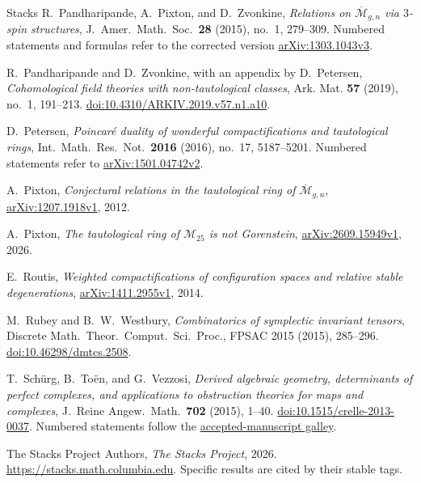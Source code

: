\begin{thebibliography}{Stacks}
R.~Pandharipande, A.~Pixton, and D.~Zvonkine,
\emph{Relations on $\overline{\mathcal M}_{g,n}$ via $3$-spin structures},
J.\ Amer.\ Math.\ Soc.\ \textbf{28} (2015), no.~1, 279--309.
Numbered statements and formulas refer to the corrected version
\href{https://arxiv.org/abs/1303.1043v3}{arXiv:1303.1043v3}.

R.~Pandharipande and D.~Zvonkine, with an appendix by D.~Petersen,
\emph{Cohomological field theories with non-tautological classes},
Ark. Mat. \textbf{57} (2019), no.~1, 191--213.
\href{https://doi.org/10.4310/ARKIV.2019.v57.n1.a10}{doi:10.4310/ARKIV.2019.v57.n1.a10}.

D.~Petersen,
\emph{Poincar\'e duality of wonderful compactifications and tautological rings},
Int.\ Math.\ Res.\ Not.\ \textbf{2016} (2016), no.~17, 5187--5201.
Numbered statements refer to
\href{https://arxiv.org/abs/1501.04742v2}{arXiv:1501.04742v2}.

A.~Pixton,
\emph{Conjectural relations in the tautological ring of
$\overline{\mathcal M}_{g,n}$},
\href{https://arxiv.org/abs/1207.1918v1}{arXiv:1207.1918v1}, 2012.

A.~Pixton,
\emph{The tautological ring of $\mathcal M_{25}$ is not Gorenstein},
\href{https://arxiv.org/abs/2609.15949v1}{arXiv:2609.15949v1}, 2026.

E.~Routis,
\emph{Weighted compactifications of configuration spaces and relative stable degenerations},
\href{https://arxiv.org/abs/1411.2955v1}{arXiv:1411.2955v1}, 2014.

M.~Rubey and B.~W.~Westbury,
\emph{Combinatorics of symplectic invariant tensors},
Discrete Math.\ Theor.\ Comput.\ Sci.\ Proc., FPSAC 2015 (2015), 285--296.
\href{https://doi.org/10.46298/dmtcs.2508}{doi:10.46298/dmtcs.2508}.

T.~Sch\"urg, B.~To\"en, and G.~Vezzosi,
\emph{Derived algebraic geometry, determinants of perfect complexes,
and applications to obstruction theories for maps and complexes},
J.\ Reine Angew.\ Math.\ \textbf{702} (2015), 1--40.
\href{https://doi.org/10.1515/crelle-2013-0037}{doi:10.1515/crelle-2013-0037}.
Numbered statements follow the
\href{https://flore.unifi.it/retrieve/e398c37f-a432-179a-e053-3705fe0a4cff/crelle.pdf}{accepted-manuscript galley}.

The Stacks Project Authors,
\emph{The Stacks Project}, 2026.
\url{https://stacks.math.columbia.edu}.
Specific results are cited by their stable tags.


\end{thebibliography}
